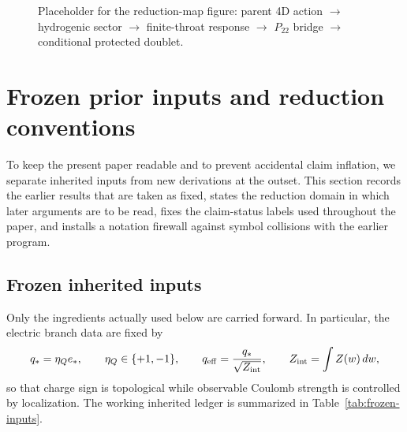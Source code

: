 \documentclass[11pt]{article}
\theoremstyle{plain}
\theoremstyle{definition}
\theoremstyle{remark}
\newcommand{\Ptwotwo}{P_{22}}
\begin{document}
\begin{figure}[t]
    \centering
    \fbox{\rule{0pt}{1.8in}\rule{0.92\linewidth}{0pt}}
    \caption{Placeholder for the reduction-map figure: parent 4D action \(\to\) hydrogenic sector \(\to\) finite-throat response \(\to\) \(\Ptwotwo\) bridge \(\to\) conditional protected doublet.}
    \label{fig:reduction-map}
\end{figure}

\section{Frozen prior inputs and reduction conventions}\label{sec:frozen}

To keep the present paper readable and to prevent accidental claim inflation, we separate inherited inputs from new derivations at the outset. This section records the earlier results that are taken as fixed, states the reduction domain in which later arguments are to be read, fixes the claim-status labels used throughout the paper, and installs a notation firewall against symbol collisions with the earlier program.

\subsection{Frozen inherited inputs}\label{subsec:frozen-inputs}

Only the ingredients actually used below are carried forward. In particular, the electric branch data are fixed by
\begin{equation}
q_* = \eta_Q e_*,
\qquad
\eta_Q\in\{+1,-1\},
\qquad
q_{\rm eff}=\frac{q_*}{\sqrt{Z_{\rm int}}},
\qquad
Z_{\rm int}=\int Z(w)\,dw,
\label{eq:frozen-charge-ledger}
\end{equation}
so that charge sign is topological while observable Coulomb strength is controlled by localization. The working inherited ledger is summarized in Table~\ref{tab:frozen-inputs}.
\end{document}
